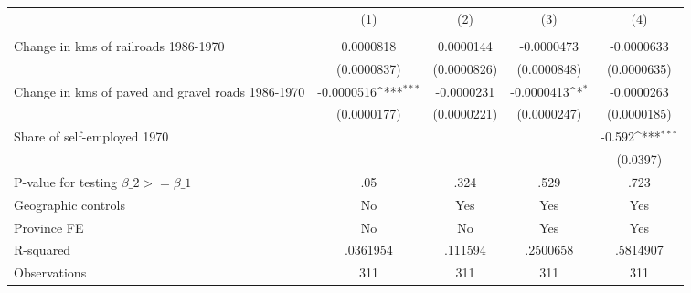 {
\def\sym#1{\ifmmode^{#1}\else\(^{#1}\)\fi}
\begin{tabular}{l*{4}{c}}
\hline\hline
                &\multicolumn{1}{c}{(1)}&\multicolumn{1}{c}{(2)}&\multicolumn{1}{c}{(3)}&\multicolumn{1}{c}{(4)}\\
                &\multicolumn{1}{c}{}&\multicolumn{1}{c}{}&\multicolumn{1}{c}{}&\multicolumn{1}{c}{}\\
\hline
Change in kms of railroads 1986-1970&0.0000818         &0.0000144         &-0.0000473         &-0.0000633         \\
                &(0.0000837)         &(0.0000826)         &(0.0000848)         &(0.0000635)         \\
[1em]
Change in kms of paved and gravel roads 1986-1970&-0.0000516\sym{***}&-0.0000231         &-0.0000413\sym{*}  &-0.0000263         \\
                &(0.0000177)         &(0.0000221)         &(0.0000247)         &(0.0000185)         \\
[1em]
Share of self-employed 1970&                  &                  &                  &   -0.592\sym{***}\\
                &                  &                  &                  & (0.0397)         \\
\hline
P-value for testing $\beta\_{2} >= \beta\_{1}$&      .05         &     .324         &     .529         &     .723         \\
Geographic controls&       No         &      Yes         &      Yes         &      Yes         \\
Province FE     &       No         &       No         &      Yes         &      Yes         \\
R-squared       & .0361954         &  .111594         & .2500658         & .5814907         \\
Observations    &      311         &      311         &      311         &      311         \\
\hline\hline
\end{tabular}
}

